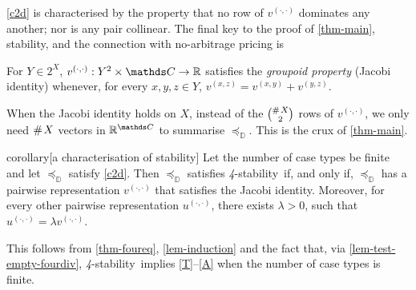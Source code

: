 \documentclass[12pt,a4paper,twoside]{article}
\newcommand{\preceqb}{\mathbin{\preceq}}
\newcommand{\countof}{\mathbin{\#}\hskip1pt}
\newcommand{\ext}{\mathrel{\mc R}}
\newcommand{\mbbd}{{\mathds D}}
\newcommand{\mbbc}{{\mathds C}}
\newcommand{\xy}{{(x, y)}}
\newcommand{\yz}{{(y,z)}}
\newcommand{\xz}{{(x,z)}}
\newcommand{\dd}{{(\cdot,\cdot)}}
\newcommand{\stability}{\textit{4}-\textup{{stability}}}
\begin{document}
\ref{c2d} is characterised by the property that no row of $v^{\dd}$ dominates
any another; nor is any pair collinear.  The final key to the proof of
\cref{thm-main}, {stability}, and the connection with no-arbitrage pricing is
\begin{definition*} %
  For $Y \in 2 ^ { X }$, $v^{ \dd } : Y^{2}\times \mbbc \rightarrow \R$
  satisfies the \emph{groupoid property} (Jacobi identity) whenever, for every
  $x , y , z \in Y$, $v ^{ \xz } = v ^{ \xy } + v ^{ \yz }$.
\end{definition*}
When the Jacobi identity holds on $X$, instead of the $\binom{\countof X}{2}$
rows of $v^{\dd}$, we only need $\countof X$ vectors in $\R^\mbbc$ to summarise
$\preceqb_\mbbd$. This is the crux of \cref{thm-main}.

   
\begin{theoremEnd}{corollary}[a characterisation of
  {stability}]\label{cor-foureq} Let the number of case types be finite and let
  $\preceq_{\mbbd}$ satisfy \ref{c2d}. Then $\preceq_{\mbbd}$ satisfies
  \stability\ if, and only if, $\preceq_{\mbbd}$ has a pairwise representation
  $v^{\dd}$ that satisfies the Jacobi identity. Moreover, for every other
  pairwise representation $u^{\dd}$, there exists $\lambda >0$, such that
  $u^{\dd} = \lambda v^{\dd}$.
 \end{theoremEnd}
 \begin{proofEnd}%
   This follows from \cref{thm-foureq}, \cref{lem-induction} and the fact that,
   via \cref{lem-test-empty-fourdiv}, \stability\ implies \ref{T}--\ref{A} when
   the number of case types is finite. \label{proof-cor-foureq}
\end{proofEnd}
\end{document}
